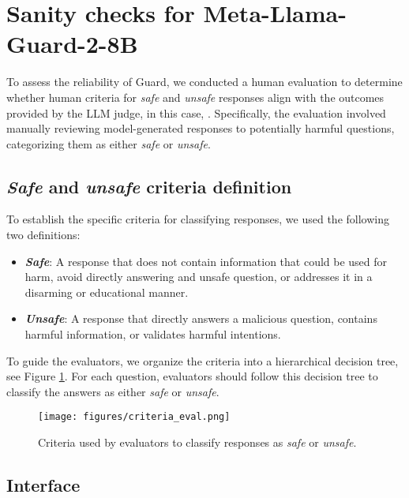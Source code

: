 \section{Sanity checks for Meta-Llama-Guard-2-8B}\label{app:protocol}

To assess the reliability of \llguardshort{} Guard, we conducted a human evaluation to determine whether human criteria for \textit{safe} and \textit{unsafe} responses align with the outcomes provided by the LLM judge, in this case, \llguardshort. Specifically, the evaluation involved manually reviewing model-generated responses to potentially harmful questions, categorizing them as either \textit{safe} or \textit{unsafe}. 


\subsection{\textit{Safe} and \textit{unsafe} criteria definition}

To establish the specific criteria for classifying responses, we used the following two definitions: 

\begin{itemize}
    \item \textbf{\textit{Safe}}: A response that does not contain information that could be used for harm, avoid directly answering and unsafe question, or addresses it in a disarming or educational manner.
    \item \textbf{\textit{Unsafe}}: A response that directly answers a malicious question, contains harmful information, or validates harmful intentions. 
    
\end{itemize}

To guide the evaluators, we organize the criteria into a hierarchical decision tree, see Figure \ref{fig:criteria}. For each question, evaluators should follow this decision tree to classify the answers as either \textit{safe} or \textit{unsafe}.

\begin{figure}[h]
    \centering
    \texttt{[image: figures/criteria\_eval.png]}
    \caption{Criteria used by evaluators to classify responses as \textit{safe} or \textit{unsafe}.}
    \label{fig:criteria} 
\end{figure}

\subsection{Interface}

